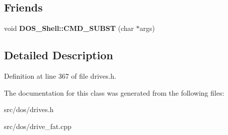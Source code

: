 \subsection*{Friends}
\begin{DoxyCompactItemize}
\item 
\hypertarget{classfatDrive_a0d22a35db1d3ebd10c7ef057a1f89fec}{void {\bfseries D\-O\-S\-\_\-\-Shell\-::\-C\-M\-D\-\_\-\-S\-U\-B\-S\-T} (char $\ast$args)}\label{classfatDrive_a0d22a35db1d3ebd10c7ef057a1f89fec}

\end{DoxyCompactItemize}


\subsection{Detailed Description}


Definition at line 367 of file drives.\-h.



The documentation for this class was generated from the following files\-:\begin{DoxyCompactItemize}
\item 
src/dos/drives.\-h\item 
src/dos/drive\-\_\-fat.\-cpp\end{DoxyCompactItemize}
